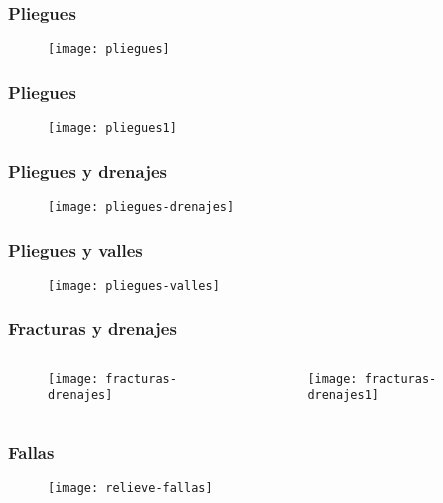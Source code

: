 \documentclass[14pt]{beamer}
\begin{document}
  \begin{frame}
\frametitle{Pliegues}
 \begin{figure}
    \centering
    \texttt{[image: pliegues]}
  \end{figure}
\end{frame}
  \begin{frame}
\frametitle{Pliegues}
 \begin{figure}
    \centering
    \texttt{[image: pliegues1]}
  \end{figure}
\end{frame}
  \begin{frame}
\frametitle{Pliegues y drenajes}
 \begin{figure}
    \centering
    \texttt{[image: pliegues-drenajes]}
  \end{figure}
\end{frame}
  \begin{frame}
\frametitle{Pliegues y valles}
 \begin{figure}
    \centering
    \texttt{[image: pliegues-valles]}
  \end{figure}
\end{frame}
  \begin{frame}
\frametitle{Fracturas y drenajes}
\begin{columns}
\begin{column}{0.5\linewidth}
 \begin{figure}
    \centering
    \texttt{[image: fracturas-drenajes]}
  \end{figure}
\end{column}
\begin{column}{0.5\linewidth}
 \begin{figure}
    \centering
    \texttt{[image: fracturas-drenajes1]}
  \end{figure}
\end{column}
\end{columns}

\end{frame}
  \begin{frame}
\frametitle{Fallas}
 \begin{figure}
    \centering
    \texttt{[image: relieve-fallas]}
  \end{figure}
\end{frame}
\end{document}
